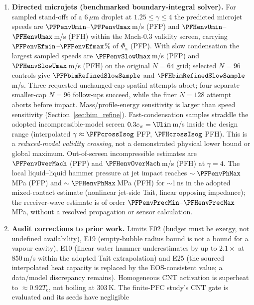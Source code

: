 \begin{enumerate}[leftmargin=*,itemsep=2pt]
$\alpha_{\mathrm c}=0.3$ speed changes $\kmRefineMaxUncensoredDeltaU$\% from 160 to 320 nodes;
all six refined cases carry an ideal-vapour warning.
Gels arrest the expansion of small PFP droplets before full vaporisation (3 and 6\,$\mu$m at 20\,kPa, 3\,$\mu$m at
5\,kPa), removing the violent collapse in this model.
\item \textbf{Directed microjets (benchmarked boundary-integral solver).} For sampled stand-offs of a 6\,$\mu$m droplet at
$1.25\le\gamma\le4$ the predicted microjet speeds are $\PFPenvUmin$--$\PFPenvUmax$\,m/s (PFP) and
$\PFHenvUmin$--$\PFHenvUmax$\,m/s (PFH) within the Mach-0.3 validity screen, carrying $\PFPenvEfmin$--$\PFPenvEfmax$\% of
$\Phi_{\mathrm a}$ (PFP). With slow condensation the largest sampled speeds are $\PFPenvSlowUmax$\,m/s (PFP) and
$\PFHenvSlowUmax$\,m/s (PFH) on the original $N=64$ grid; selected $N=96$ controls give
$\PFPbimRefinedSlowSample$ and $\PFHbimRefinedSlowSample$\,m/s.
Three requested unchanged-cap spatial attempts abort; four separate smaller-cap $N=96$
follow-ups succeed, while the finer $N=128$ attempt aborts before impact.
Mass/profile-energy sensitivity is larger than speed sensitivity (Section~\ref{sec:bim_refine}).
Fast-condensation samples straddle the adopted incompressible-model
screen $0.3c_{\mathrm w}=\Ulim$\,m/s inside the design range (interpolated $\gamma\approx\PFPcrossIsog$ PFP,
$\PFHcrossIsog$ PFH). This is a \emph{reduced-model validity crossing}, not a demonstrated physical
lower bound or global maximum. Out-of-screen incompressible estimates are $\PFPenvOverMach$ (PFP)
and $\PFHenvOverMach$\,m/s (PFH) at $\gamma=4$. The local
liquid--liquid hammer pressure at jet impact reaches $\sim\PFPenvPhMax$\,MPa (PFP) and $\sim\PFHenvPhMax$\,MPa (PFH) for
$\sim$1\,ns in the adopted mixed-contact estimate (nonlinear jet-side Tait, linear opposing
impedance); the receiver-wave estimate is of order
$\PFPenvPrecMin$--$\PFHenvPrecMax$\,MPa, without a resolved propagation or sensor calculation.
\item \textbf{Audit corrections to prior work.} Limits E02 (budget must be exergy, not undefined availability),
E19 (empty-bubble radius bound is not a bound for a vapour cavity), E10 (linear water hammer underestimates by
up to $2.1\times$ at 850\,m/s within the adopted Tait extrapolation) and E25 (the sourced interpolated
heat capacity is replaced by the EOS-consistent value; a data/model discrepancy remains).
Homogeneous CNT activation is superheat to $\approx0.92T_{\mathrm c}$,
not boiling at 303\,K. The finite-PFC study's CNT gate is evaluated and its seeds have negligible

\end{enumerate}
